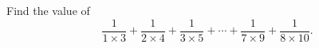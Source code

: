 Find the value of
\[\dfrac{1}{1\times3}+\dfrac{1}{2\times4}+\dfrac{1}{3\times5}+\cdots+\dfrac{1}{7\times9}+\dfrac{1}{8\times10}.\]
